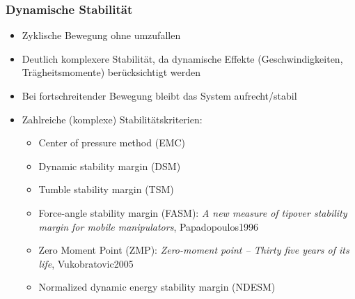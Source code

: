 \subsubsection{Dynamische Stabilität}
\begin{itemize}
\item Zyklische Bewegung ohne umzufallen
\item Deutlich komplexere Stabilität, da dynamische Effekte (Geschwindigkeiten, Trägheitsmomente) berücksichtigt werden
\item Bei fortschreitender Bewegung bleibt das System aufrecht/stabil
\item Zahlreiche (komplexe) Stabilitätskriterien:
\begin{itemize}
\item Center of pressure method (EMC)
\item Dynamic stability margin (DSM)
\item Tumble stability margin (TSM)
\item Force-angle stability margin (FASM): \textit{A new measure of tipover stability margin for mobile manipulators}, Papadopoulos1996
\item Zero Moment Point (ZMP): \textit{Zero-moment point -- Thirty five years of its life}, Vukobratovic2005
\item Normalized dynamic energy stability margin (NDESM)
\end{itemize}
\end{itemize}
